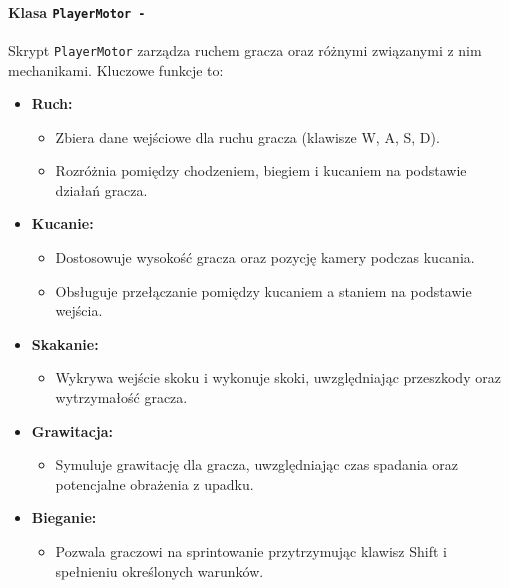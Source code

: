 \paragraph{Klasa \texttt{PlayerMotor -}}
Skrypt \texttt{PlayerMotor} zarządza ruchem gracza oraz różnymi związanymi z nim mechanikami. Kluczowe funkcje to:
\begin{itemize}
  \item \textbf{Ruch:}
    \begin{itemize}
      \item Zbiera dane wejściowe dla ruchu gracza (klawisze W, A, S, D).
      \item Rozróżnia pomiędzy chodzeniem, biegiem i kucaniem na podstawie działań gracza.
    \end{itemize}
  \item \textbf{Kucanie:}
    \begin{itemize}
      \item Dostosowuje wysokość gracza oraz pozycję kamery podczas kucania.
      \item Obsługuje przełączanie pomiędzy kucaniem a staniem na podstawie wejścia.
    \end{itemize}
  \item \textbf{Skakanie:}
    \begin{itemize}
      \item Wykrywa wejście skoku i wykonuje skoki, uwzględniając przeszkody oraz wytrzymałość gracza.
    \end{itemize}
  \item \textbf{Grawitacja:}
    \begin{itemize}
      \item Symuluje grawitację dla gracza, uwzględniając czas spadania oraz potencjalne obrażenia z upadku.
    \end{itemize}
  \item \textbf{Bieganie:}
    \begin{itemize}
      \item Pozwala graczowi na sprintowanie przytrzymując klawisz Shift i spełnieniu określonych warunków.
    \end{itemize}
\end{itemize}


